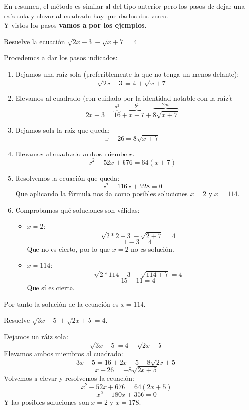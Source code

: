 \documentclass[a4paper,11pt,answers]{exam}
\begin{document}
En resumen, el método es similar al del tipo anterior pero los pasos de dejar una raíz sola y
elevar al cuadrado hay que darlos dos veces.\\

Y vistos los pasos \textbf{vamos a por los ejemplos}.

\begin{questions}
\question Resuelve la ecuación $\sqrt{2x - 3} - \sqrt{x+7} = 4$
  \begin{solution}
    Procedemos a dar los pasos indicados:
    \begin{enumerate}
    \item Dejamos una raíz sola (preferiblemente la que no tenga un menos delante);
      \[\sqrt{2x - 3} = 4 + \sqrt{x + 7}\]
    \item Elevamos al cuadrado (con cuidado por la identidad notable con la raíz):
      \[2x - 3 = \overbrace{16}^{a^2} + \overbrace{x + 7}^{b^2} + \overbrace{8\sqrt{x+7}}^{2ab}\]
    \item Dejamos sola la raíz que queda:
      \[x -26 = 8\sqrt{x+7}\]
    \item Elevamos al cuadrado ambos miembros:
      \[x^2 -52x + 676 = 64 (x +7)\]
    \item Resolvemos la ecuación que queda:
      \[x^2 - 116x +228 = 0\]
      Que aplicando la fórmula nos da como posibles soluciones $x=2$ y $x=114$.
    \item Comprobamos qué soluciones son válidas:
      \begin{itemize}
      \item $x = 2$:
        \[\sqrt{2*2-3} - \sqrt{2+7} = 4\]
        \[1-3 = 4\]
        Que no es cierto, por lo que $x=2$ no es solución.
      \item $x = 114$:
        \[\sqrt{2*114-3} - \sqrt{114 +7} = 4\]
        \[15 - 11 = 4\]
        Que sí es cierto.
      \end{itemize}
    \end{enumerate}
    Por tanto la solución de la ecuación es $x = 114$.
  \end{solution}
\question Resuelve $\sqrt{3x - 5} + \sqrt{2x + 5} = 4$.
  \begin{solution}
    Dejamos un ráiz sola:
    \[\sqrt{3x - 5} = 4 - \sqrt{2x +5}\]
    Elevamos ambos miembros al cuadrado:
    \[3x - 5 = 16 +2x + 5 - 8 \sqrt{2x +5}\]
    \[x -26 = -8\sqrt{2x+5}\]
    Volvemos a elevar y resolvemos la ecuación:
    \[x^2 - 52x + 676 = 64(2x+5)\]
    \[x^2 - 180x + 356 = 0\]
    Y las posibles soluciones son $x = 2$ y $x = 178$.\\

\end{solution}
\end{questions}
\end{document}

